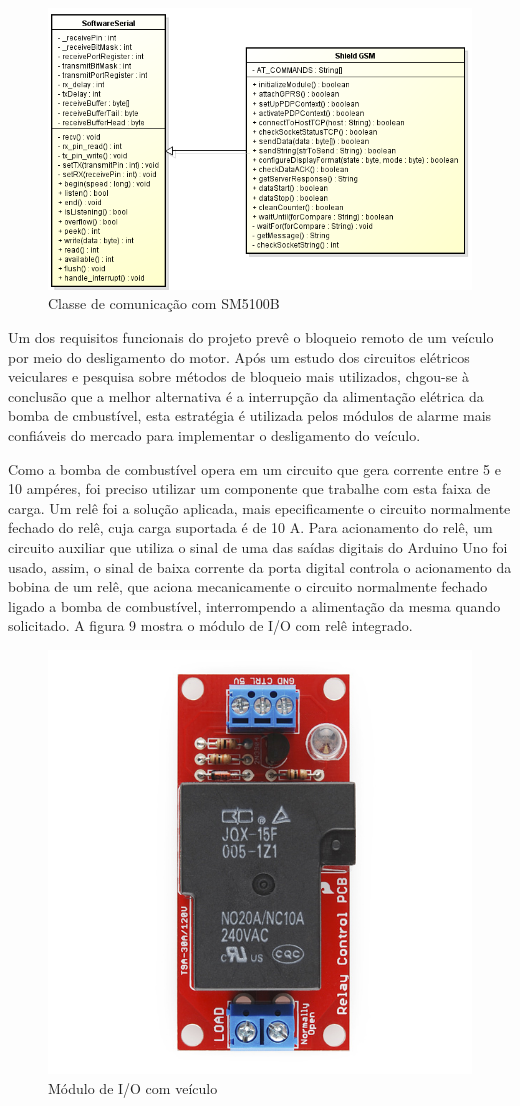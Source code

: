 \begin{figure}[!htb]
	\centering
	\includegraphics[width=9.00cm\textwidth]{figures/lib_gsm.png}
	\caption{Classe de comunicação com SM5100B}
	\label{Figura 8}
\end{figure}

Um dos requisitos funcionais do projeto prevê o bloqueio remoto de um veículo por meio do desligamento 
do motor. Após um estudo dos circuitos elétricos veiculares e pesquisa sobre métodos de bloqueio mais
utilizados, chgou-se à conclusão que a melhor alternativa é a interrupção da alimentação elétrica
da bomba de cmbustível, esta estratégia é utilizada pelos módulos de alarme mais confiáveis do mercado
para implementar o desligamento do veículo.

Como a bomba de combustível opera em um circuito que gera corrente entre 5 e 10 ampéres, foi preciso
utilizar um componente que trabalhe com esta faixa de carga. Um relê foi a solução aplicada, mais epecificamente
o circuito normalmente fechado do relê, cuja carga suportada é de 10 A. Para acionamento do relê, um circuito
auxiliar que utiliza o sinal de uma das saídas digitais do Arduino Uno foi usado, assim, o sinal de baixa corrente
da porta digital controla o acionamento da bobina de um relê, que aciona mecanicamente o circuito normalmente fechado
ligado a bomba de combustível, interrompendo a alimentação da mesma quando solicitado. A figura 9 mostra o módulo de
I/O com relê integrado.

\begin{figure}[!htb]
	\centering
	\includegraphics[width=5.00cm\textwidth]{figures/beefcake2.jpg}
	\caption{Módulo de I/O com veículo}
	\label{Figura 9}
\end{figure}

